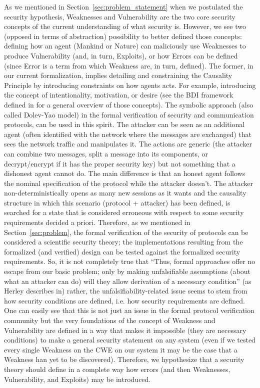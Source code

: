As we mentioned in Section~\ref{sec:problem_statement} when we postulated the
security hypothesis, Weaknesses and Vulnerability are the two core security
concepts of the current understanding of what security is. However, we see two
(opposed in terms of abstraction) possibility to better defined those concepts:
defining how an agent (Mankind or Nature) can maliciously use Weaknesses to
produce Vulnerability (and, in turn, Exploits), or how Errors can be defined
(since Error is a term from which Weakness are, in turn, defined).  The former,
in our current formalization, implies detailing and constraining the Causality
Principle by introducing constraints on how agents acts. For example,
introducing the concept of intentionality, motivation, or desire (see the BDI
framework defined in \autocite{BDI} for a general overview of those concepts).
The symbolic approach (also called Dolev-Yao model) in the formal verification
of security and communication protocols, can be used in this spirit. The
attacker can be seen as an additional agent (often identified with the network
where the messages are exchanged) that sees the network traffic and manipulates
it. The actions are generic (the attacker can combine two messages, split a
message into its components, or decrypt/encrypt if it has the proper security
key) but not something that a dishonest agent cannot do. The main difference is
that an honest agent follows the nominal specification of the protocol while
the attacker doesn't. The attacker non-deterministically opens as many new
sessions as it wants and the causality structure in which this scenario
(protocol + attacker) has been defined, is searched for a state that is
considered erroneous with respect to some security requirements decided a
priori. Therefore, as we mentioned in Section~\ref{sec:problem}, the
formal verification of the security of protocols can be considered a scientific
security theory; the implementations resulting from the formalized (and
verified) design can be tested against the formalized security requirements.
So, it is not completely true that ``Thus, formal approaches offer no escape
from our basic problem; only by making unfalsifiable assumptions (about what an
attacker can do) will they allow derivation of a necessary condition'' (as
Herley describes in\autocite{Herley2009so}) rather, the
unfalsifiability-related issue seems to stem from how security conditions are
defined, i.e. how security requirements are defined. One can easily see that
this is not just an issue in the formal protocol verification community but the
very foundations of the concept of Weakness and Vulnerability are defined in a
way that makes it impossible (they are necessary conditions) to make a general
security statement on any system (even if we tested every single Weakness on
the CWE on our system it may be the case that a Weakness han yet to be
discovered). Therefore, we hypothesize that a security theory should define in
a complete way how errors (and then Weaknesses, Vulnerability, and Exploits)
may be introduced.

